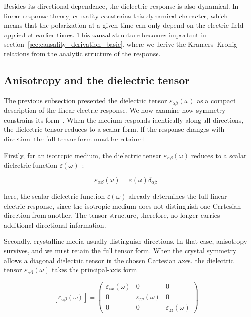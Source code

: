 Besides its directional dependence, the dielectric response is also dynamical.
In linear response theory, causality constrains this dynamical character,
which means that the polarization at a given time can only depend on the electric field applied at earlier times.
This causal structure becomes important in section~\ref{sec:causality_derivation_basic},
where we derive the Kramers--Kronig relations from the analytic structure of the response.

\FloatBarrier
\subsection{Anisotropy and the dielectric tensor}

The previous subsection presented the dielectric tensor $\varepsilon_{\alpha\beta}(\omega)$ as a compact description of the linear electric response.
We now examine how symmetry constrains its form~\cite{capper2019optical}.
When the medium responds identically along all directions, the dielectric tensor reduces to a scalar form.
If the response changes with direction, the full tensor form must be retained.

Firstly, for an isotropic medium,
the dielectric tensor $\varepsilon_{\alpha\beta}(\omega)$ reduces to a scalar dielectric function $\varepsilon(\omega)$~\cite{born2013principles}:

\begin{equation}
    \varepsilon_{\alpha\beta}(\omega)
    = \varepsilon(\omega)\delta_{\alpha\beta}
\label{isotropic_dielectric_tensor}
\end{equation}

here, the scalar dielectric function $\varepsilon(\omega)$ already determines the full linear electric response,
since the isotropic medium does not distinguish one Cartesian direction from another.
The tensor structure, therefore, no longer carries additional directional information.

Secondly, crystalline media usually distinguish directions.
In that case, anisotropy survives, and we must retain the full tensor form.
When the crystal symmetry allows a diagonal dielectric tensor in the chosen Cartesian axes,
the dielectric tensor $\varepsilon_{\alpha\beta}(\omega)$ takes the principal-axis form~\cite{nye1985physical}:

\begin{equation}
    \left[\varepsilon_{\alpha\beta}(\omega)\right] = \begin{pmatrix}
        \varepsilon_{xx}(\omega) & 0 & 0 \\
        0 & \varepsilon_{yy}(\omega) & 0 \\
        0 & 0 & \varepsilon_{zz}(\omega)
    \end{pmatrix}
\label{principal_axis_dielectric_tensor}
\end{equation}

